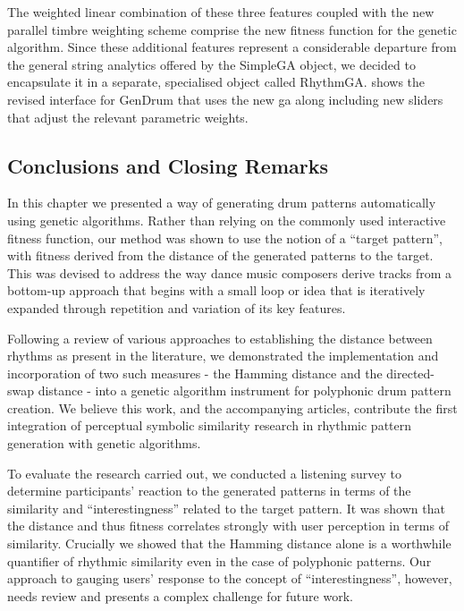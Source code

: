 {{The weighted linear combination of these three features coupled with the new parallel timbre weighting scheme comprise the new fitness function for the genetic algorithm. Since these additional features represent a considerable departure from the general string analytics offered by the SimpleGA object, we decided to encapsulate it in a separate, specialised object called RhythmGA.  shows the revised interface for GenDrum that uses the new \acrshort{ga} along including new sliders that adjust the relevant parametric weights.

\subsection{Conclusions and Closing Remarks}

In this chapter we presented a way of generating drum patterns automatically using genetic algorithms. Rather than relying on the commonly used interactive fitness function, our method was shown to use the notion of a “target pattern”, with fitness derived from the distance of the generated patterns to the target. This was devised to address the way dance music composers derive tracks from a bottom-up approach that begins with a small loop or idea that is iteratively expanded through repetition and variation of its key features.

Following a review of various approaches to establishing the distance between rhythms as present in the literature, we demonstrated the implementation and incorporation of two such measures - the Hamming distance and the directed-swap distance - into a genetic algorithm instrument for polyphonic drum pattern creation. We believe this work, and the accompanying articles, contribute the first integration of perceptual symbolic similarity research in rhythmic pattern generation with genetic algorithms.

To evaluate the research carried out, we conducted a listening survey to determine participants' reaction to the generated patterns in terms of the similarity and “interestingness” related to the target pattern. It was shown that the distance and thus fitness correlates strongly with user perception in terms of similarity. Crucially we showed that the Hamming distance alone is a worthwhile quantifier of rhythmic similarity even in the case of polyphonic patterns. Our approach to gauging users' response to the concept of  “interestingness”, however, needs review and presents a complex challenge for future work. 

}}
